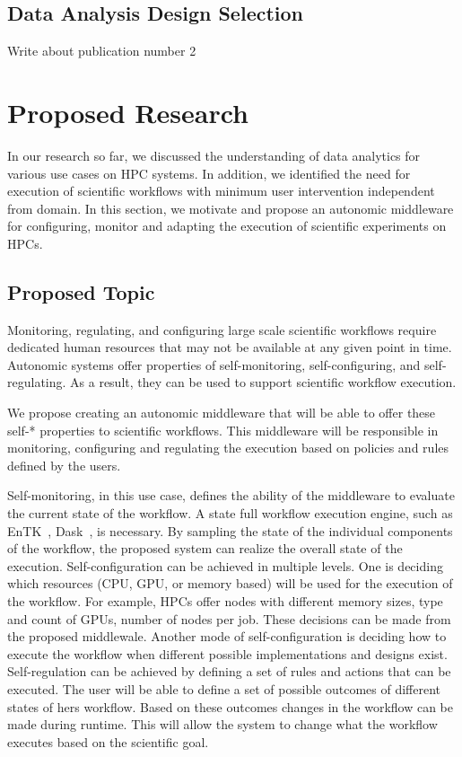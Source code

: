 \subsection{Data Analysis Design Selection}

Write about publication number 2

\section{Proposed Research}

In our research so far, we discussed the understanding of data analytics for various use cases on HPC systems. In addition, we identified the need for execution of scientific workflows with minimum user intervention independent from domain. In this section, we motivate and propose an autonomic middleware for configuring, monitor and adapting the execution of scientific experiments on HPCs.

\subsection{Proposed Topic}
Monitoring, regulating, and configuring large scale scientific workflows require dedicated human resources that may not be available at any given point in time. Autonomic systems offer properties of self-monitoring, self-configuring, and self-regulating. As a result, they can be used to support scientific workflow execution.

We propose creating an autonomic middleware that will be able to offer these self-* properties to scientific workflows. This middleware will be responsible in monitoring, configuring and regulating the execution based on policies and rules defined by the users. 

Self-monitoring, in this use case, defines the ability of the middleware to evaluate the current state of the workflow. A state full workflow execution engine, such as EnTK~\cite{balasubramanian2018harnessing}, Dask~\cite{rocklin2015dask}, is necessary. By sampling the state of the individual components of the workflow, the proposed system can realize the overall state of the execution. Self-configuration can be achieved in multiple levels. One is deciding which resources (CPU, GPU, or memory based) will be used for the execution of the workflow. For example, HPCs offer nodes with different memory sizes, type and count of GPUs, number of nodes per job. These decisions can be made from the proposed middlewale. Another mode of self-configuration is deciding how to execute the workflow when different possible implementations and designs exist.  Self-regulation can be achieved by defining a set of rules and actions that can be executed. The user will be able to define a set of possible outcomes of different states of hers workflow. Based on these outcomes changes in the workflow can be made during runtime. This will allow the system to change what the workflow executes based on the scientific goal.

